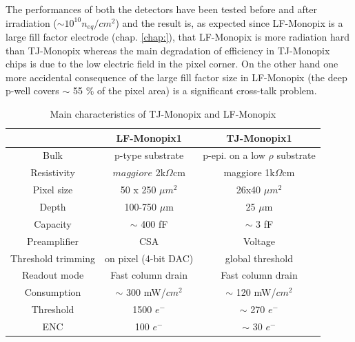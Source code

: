 The performances of both the detectors have been tested before and after irradiation ($\sim 10^{10} n_{eq}/cm^{2}$) and the result is, as expected since LF-Monopix is a large fill factor electrode (chap. \ref{chap:}), that LF-Monopix is more radiation hard than TJ-Monopix whereas the main degradation of efficiency in TJ-Monopix chips is due to the low electric field in the pixel corner. On the other hand one more accidental consequence of the large fill factor size in LF-Monopix (the deep p-well covers $\sim$ 55 $\%$ of the pixel area) is a significant cross-talk problem.
\begin{table}
    \begin{center}
    \begin{tabular}{|c | c |c |}
    \hline
    & LF-Monopix1 & TJ-Monopix1\\
    \hline
    \hline
    Bulk & p-type substrate & p-epi. on a low $\rho$ substrate \\
    Resistivity & $maggiore$ 2k$\Omega$cm & maggiore 1k$\Omega$cm\\
    Pixel size & 50 x 250 $\mu m^2$ & 26x40 $\mu m^2$ \\
    Depth & 100-750 $\mu$m & 25 $\mu$m \\
    Capacity & $\sim$ 400 fF & $\sim$ 3 fF\\
    Preamplifier & CSA & Voltage \\
    Threshold trimming & on pixel (4-bit DAC) & global threshold\\
    Readout mode & Fast column drain & Fast column drain\\
    Consumption & $\sim$ 300 mW/$cm^2$& $\sim$ 120 mW/$cm^2$ \\
    Threshold & 1500 $e^-$ & $\sim$ 270 $e^-$ \\
    ENC & 100 $e^-$ & $\sim$ 30 $e^-$\\
    \hline
    \end{tabular}
    \caption{Main characteristics of TJ-Monopix and LF-Monopix \cite{LF-TJ-Monopix}}
    \label{tab:LF-TJ-Monopix}
    \end{center}
 \end{table}

